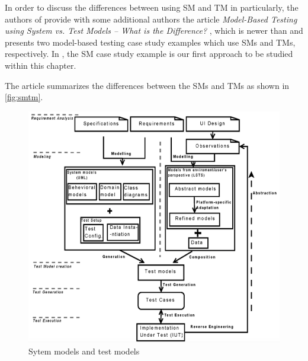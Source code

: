 In order to discuss the differences between using SM and TM in particularly, the authors of \cite{Paper1} provide with some additional authors the article \textit{Model-Based Testing using System vs. Test Models – What is the Difference?} \cite{SMvsTM}, which is newer than \cite{Paper1} and presents two model-based testing case study examples which use SMs and TMs, respectively. In \cite{SMvsTM}, the SM case study example is our first approach \cite{Paper1} to be studied within this chapter.

The article \cite{SMvsTM} summarizes the differences between the SMs and TMs as shown in \autoref{fig:smtm}.

\begin{figure} [H] 
\centering
\includegraphics[scale=0.35]{../images/smtm} 
\caption{Sytem models and test models}
\label{fig:smtm}
\end{figure}


